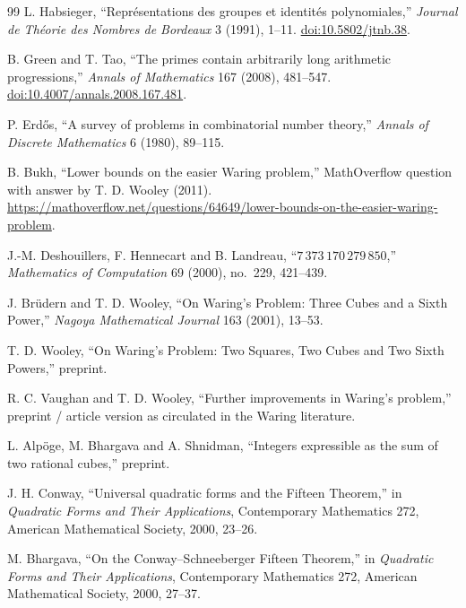 \documentclass[../Axiomathic.tex]{subfiles}
\begin{document}
\begin{thebibliography}{99}
L. Habsieger,
``Repr\'esentations des groupes et identit\'es polynomiales,''
\emph{Journal de Th\'eorie des Nombres de Bordeaux} 3 (1991), 1--11.
\href{https://doi.org/10.5802/jtnb.38}{doi:10.5802/jtnb.38}.

B. Green and T. Tao,
``The primes contain arbitrarily long arithmetic progressions,''
\emph{Annals of Mathematics} 167 (2008), 481--547.
\href{https://doi.org/10.4007/annals.2008.167.481}{doi:10.4007/annals.2008.167.481}.

P. Erd\H{o}s,
``A survey of problems in combinatorial number theory,''
\emph{Annals of Discrete Mathematics} 6 (1980), 89--115.

B. Bukh, ``Lower bounds on the easier Waring problem,''
MathOverflow question with answer by T. D. Wooley (2011).
\url{https://mathoverflow.net/questions/64649/lower-bounds-on-the-easier-waring-problem}.


J.-M. Deshouillers, F. Hennecart and B. Landreau,
``$7\,373\,170\,279\,850$,''
\emph{Mathematics of Computation} 69 (2000), no.~229, 421--439.

J. Br\"udern and T. D. Wooley,
``On Waring's Problem: Three Cubes and a Sixth Power,''
\emph{Nagoya Mathematical Journal} 163 (2001), 13--53.

T. D. Wooley,
``On Waring's Problem: Two Squares, Two Cubes and Two Sixth Powers,''
preprint.

R. C. Vaughan and T. D. Wooley,
``Further improvements in Waring's problem,''
preprint / article version as circulated in the Waring literature.

L. Alp\"oge, M. Bhargava and A. Shnidman,
``Integers expressible as the sum of two rational cubes,''
preprint.

J. H. Conway,
``Universal quadratic forms and the Fifteen Theorem,''
in \emph{Quadratic Forms and Their Applications}, Contemporary Mathematics 272, American Mathematical Society, 2000, 23--26.

M. Bhargava,
``On the Conway--Schneeberger Fifteen Theorem,''
in \emph{Quadratic Forms and Their Applications}, Contemporary Mathematics 272, American Mathematical Society, 2000, 27--37.

\end{thebibliography}
\end{document}
